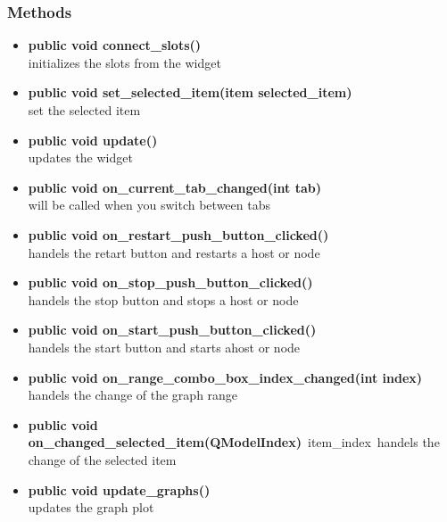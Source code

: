 \subsubsection{Methods}
\begin{itemize}
  \item \textbf{public void connect\_slots()}\\
  initializes the slots from the widget
  \item \textbf{public void set\_selected\_item(item selected\_item)}\\
  set the selected item
  \item \textbf{public void update()}\\
  updates the widget
  \item \textbf{public void on\_current\_tab\_changed(int tab)}\\
  will be called when you switch between tabs
  \item \textbf{public void on\_restart\_push\_button\_clicked()}\\
  handels the retart button and restarts a host or node
  \item \textbf{public void on\_stop\_push\_button\_clicked()}\\
  handels the stop button and stops a host or node
  \item \textbf{public void on\_start\_push\_button\_clicked()}\\
  handels the start button and starts ahost or node
  \item \textbf{public void on\_range\_combo\_box\_index\_changed(int index)}\\
  handels the change of the graph range
  \item \textbf{public void on\_changed\_selected\_item(QModelIndex)}\
  item\_index\ handels the change of the selected item
  \item \textbf{public void update\_graphs()}\\
  updates the graph plot
\end{itemize}